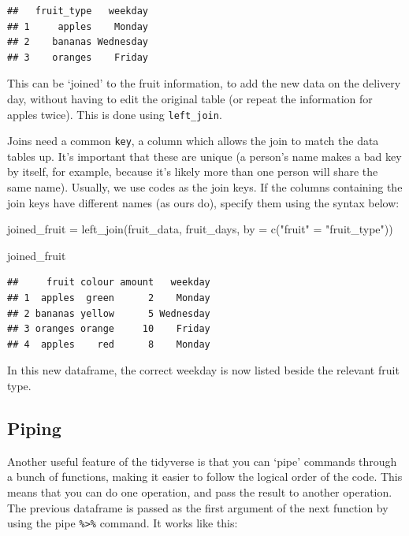 \documentclass[
]{book}
\newenvironment{Shaded}{\begin{snugshade}}{\end{snugshade}}
\newcommand{\AttributeTok}[1]{\textcolor[rgb]{0.77,0.63,0.00}{#1}}
\newcommand{\FunctionTok}[1]{\textcolor[rgb]{0.00,0.00,0.00}{#1}}
\newcommand{\NormalTok}[1]{#1}
\newcommand{\OtherTok}[1]{\textcolor[rgb]{0.56,0.35,0.01}{#1}}
\newcommand{\StringTok}[1]{\textcolor[rgb]{0.31,0.60,0.02}{#1}}
\begin{document}
\begin{verbatim}
##   fruit_type   weekday
## 1     apples    Monday
## 2    bananas Wednesday
## 3    oranges    Friday
\end{verbatim}

This can be `joined' to the fruit information, to add the new data on the delivery day, without having to edit the original table (or repeat the information for apples twice). This is done using \texttt{left\_join}.

Joins need a common \texttt{key}, a column which allows the join to match the data tables up. It's important that these are unique (a person's name makes a bad key by itself, for example, because it's likely more than one person will share the same name). Usually, we use codes as the join keys. If the columns containing the join keys have different names (as ours do), specify them using the syntax below:

\begin{Shaded}
\begin{Highlighting}[]
\NormalTok{joined\_fruit }\OtherTok{=} \FunctionTok{left\_join}\NormalTok{(fruit\_data, fruit\_days, }\AttributeTok{by =} \FunctionTok{c}\NormalTok{(}\StringTok{"fruit"} \OtherTok{=} \StringTok{"fruit\_type"}\NormalTok{))}

\NormalTok{joined\_fruit}
\end{Highlighting}
\end{Shaded}

\begin{verbatim}
##     fruit colour amount   weekday
## 1  apples  green      2    Monday
## 2 bananas yellow      5 Wednesday
## 3 oranges orange     10    Friday
## 4  apples    red      8    Monday
\end{verbatim}

In this new dataframe, the correct weekday is now listed beside the relevant fruit type.

\hypertarget{piping}{%
\subsection{Piping}\label{piping}}

Another useful feature of the tidyverse is that you can `pipe' commands through a bunch of functions, making it easier to follow the logical order of the code. This means that you can do one operation, and pass the result to another operation. The previous dataframe is passed as the first argument of the next function by using the pipe \texttt{\%\textgreater{}\%} command. It works like this:
\end{document}
